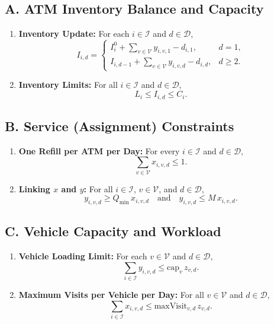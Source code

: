 \documentclass[11pt]{article}
\begin{document}
\subsection*{A. ATM Inventory Balance and Capacity}
\begin{enumerate}[label=\textbf{(A\arabic*)}]
    \item \textbf{Inventory Update:} For each \(i \in \mathcal{I}\) and \(d \in \mathcal{D}\),
    \[
    I_{i,d} =
    \begin{cases}
    I_i^0 + \displaystyle\sum_{v \in \mathcal{V}} y_{i,v,1} - d_{i,1}, & d=1,\\[1mm]
    I_{i,d-1} + \displaystyle\sum_{v \in \mathcal{V}} y_{i,v,d} - d_{i,d}, & d \ge 2.
    \end{cases}
    \]
    \item \textbf{Inventory Limits:} For all \(i \in \mathcal{I}\) and \(d \in \mathcal{D}\),
    \[
    L_i \le I_{i,d} \le C_i.
    \]
\end{enumerate}

\subsection*{B. Service (Assignment) Constraints}
\begin{enumerate}[label=\textbf{(B\arabic*)}]
    \item \textbf{One Refill per ATM per Day:} For every \(i \in \mathcal{I}\) and \(d \in \mathcal{D}\),
    \[
    \sum_{v \in \mathcal{V}} x_{i,v,d} \le 1.
    \]
    \item \textbf{Linking \(x\) and \(y\):} For all \(i \in \mathcal{I}\), \(v \in \mathcal{V}\), and \(d \in \mathcal{D}\),
    \[
    y_{i,v,d} \ge Q_{\min} \, x_{i,v,d} \quad \text{and} \quad y_{i,v,d} \le M\, x_{i,v,d}.
    \]
\end{enumerate}

\subsection*{C. Vehicle Capacity and Workload}
\begin{enumerate}[label=\textbf{(C\arabic*)}]
    \item \textbf{Vehicle Loading Limit:} For each \(v \in \mathcal{V}\) and \(d \in \mathcal{D}\),
    \[
    \sum_{i \in \mathcal{I}} y_{i,v,d} \le \text{cap}_v \, z_{v,d}.
    \]
    \item \textbf{Maximum Visits per Vehicle per Day:} For all \(v \in \mathcal{V}\) and \(d \in \mathcal{D}\),
    \[
    \sum_{i \in \mathcal{I}} x_{i,v,d} \le \text{maxVisit}_{v,d} \, z_{v,d}.
    \]
\end{enumerate}
\end{document}
